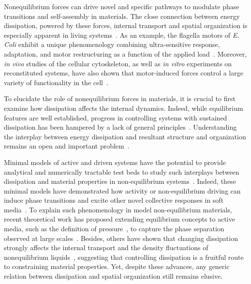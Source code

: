 \documentclass[pre, superscriptaddress, twocolumn,pre]{revtex4-1}
\begin{document}
Nonequilibrium forces can drive novel and specific pathways to modulate phase transitions and self-assembly in materials. The close connection between energy dissipation, powered by these forces, internal transport and spatial organization is especially apparent in living systems~\cite{Toyabe2010, Ahmed2016, Battle604, Mura2018}. As an example, the flagella motors of {\it E. Coli} exhibit a unique phenomenology combining ultra-sensitive response, adaptation, and motor restructuring as a function of the applied load~\cite{Lele2013, Lan2012, Wang2017}. Moreover, {\it in vivo} studies of the cellular cytoskeleton, as well as {\it in vitro} experiments on reconstituted systems, have also shown that motor-induced forces control a large variety of functionality in the cell~\cite{Silva2011, Sanchez2012, Blanchoin2014, Murrell2015, Decamp2015}.



To elucidate the role of nonequilibrium forces in materials, it is crucial to first examine how dissipation affects the internal dynamics. Indeed, while equilibrium features are well established, progress in controlling systems with sustained dissipation has been hampered by a lack of general principles~\cite{Cates2015, Solon2015a, Nguyen2016, Fodor2016, Murugan2017, Nguyen2018}. Understanding the interplay between energy dissipation and resultant structure and organization remains an open and important problem~\cite{Mizuno2007,Wilhelm2008,Fodor2016,Turlier2016,Nardini2017}.

Minimal models of active and driven systems  have the potential to provide analytical and numerically tractable test beds to study such interplays between dissipation and material properties in non-equilibrium systems~\cite{Marchetti2013, Han2016, Bechinger2016, delJunco2018, Marchetti2018}. Indeed, these minimal models have demonstrated how activity or non-equilibrium driving can induce phase transitions and excite other novel collective responses in soft media~\cite{Cates2015,Han2016,Nguyen2016}. To explain such phenomenology in model non-equilibrium materials, recent theoretical work has proposed extending equilibrium concepts to active media, such as the definition of pressure~\cite{Takatori2015, Solon2015a, Solon2015b}, to capture the phase separation observed at large scales~\cite{Solon2018, Solon2018b}. Besides, others have shown that changing dissipation strongly affects the internal transport and the density fluctuations of nonequilibrium liquids~\cite{Cagnetta2017, delJunco2018, nemoto2018optimizing, Nemoto2018a}, suggesting that controlling dissipation is a fruitful route to constraining material properties. Yet, despite these advances, any generic relation between dissipation and spatial organization still remains elusive.
\end{document}
